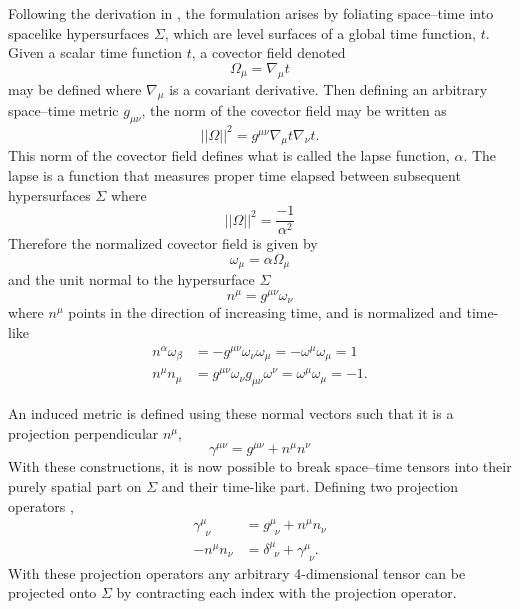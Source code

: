 \documentclass[11pt]{article}
\newcommand{\blank}{\enspace}
\numberwithin{equation}{section}
\begin{document}
Following the derivation in \cite{baumgarte_shapiro_2010}, the formulation arises by foliating space--time into spacelike hypersurfaces $\Sigma$, which are level surfaces of a global time function, $t$. Given a scalar time function $t$, a covector field denoted 
\begin{equation}\label{covectorfield}
    \Omega_{\mu} = \nabla_{\mu}t
\end{equation}
may be defined where $\nabla_{\mu}$ is a covariant derivative. 
Then defining an arbitrary space--time metric $g_{\mu\nu}$, the norm of the covector field may be written as
\begin{equation}
    \rvert\rvert \Omega \rvert\rvert^2 = g^{\mu\nu}\nabla_{\mu}t\nabla_{\nu}t.
\end{equation}
This norm of the covector field defines what is called the lapse function, $\alpha$. The lapse is a function that measures proper time elapsed between subsequent hypersurfaces $\Sigma$ where 
\begin{equation}
    \rvert\rvert \Omega \rvert\rvert^2 = \frac{-1}{\alpha^2}
\end{equation}
Therefore the normalized covector field is given by
\begin{equation}\label{normalizedcovectorfield}
    \omega_{\mu} = \alpha\Omega_{\mu} 
\end{equation}
and the unit normal to the hypersurface $\Sigma$
\begin{equation}
    n^{\mu} = g^{\mu\nu}\omega_{\nu}
\end{equation}
where $n^{\mu}$ points in the direction of increasing time, and is normalized and time-like 
\begin{align}
    n^{\alpha}\omega_{\beta} &= -g^{\mu\nu}\omega_{\nu}\omega_{\mu} = -\omega^{\mu}\omega_{\mu} = 1 \\
    n^{\mu}n_{\mu} &= g^{\mu\nu}\omega_{\nu}g_{\mu\nu} \omega^{\nu} = \omega^{\mu} \omega_{\mu} = -1. \label{normalcontract}
\end{align}

An induced metric is defined using these normal vectors such that it is a projection perpendicular $n^{\mu}$,
\begin{equation}
    \gamma^{\mu\nu} = g^{\mu\nu} + n^{\mu}n^{\nu}
\end{equation}
With these constructions, it is now possible to break space--time tensors into their purely spatial part on $\Sigma$ and their time-like part. Defining two projection operators \cite{baumgarte_shapiro_2010} ,
\begin{align}
    \gamma^{\mu}_{\blank\nu} &= g^{\mu}_{\blank\nu} + n^{\mu}n_{\nu} \\
    -n^{\mu}n_{\nu} &= \delta^{\mu}_{\blank\nu} + \gamma^{\mu}_{\blank\nu}.
\end{align}
With these projection operators any arbitrary 4-dimensional tensor can be projected onto $\Sigma$ by contracting each index with the projection operator. 
\end{document}
